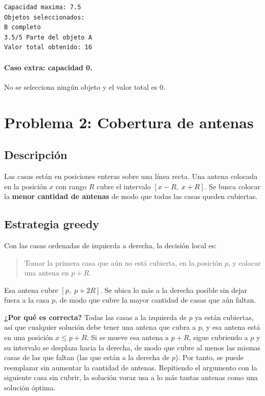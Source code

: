 \documentclass[11pt,a4paper]{article}
\begin{document}
\begin{verbatim}
Capacidad maxima: 7.5
Objetos seleccionados:
B completo
3.5/5 Parte del objeto A
Valor total obtenido: 16
\end{verbatim}

\paragraph{Caso extra: capacidad 0.} No se selecciona ningún objeto y el valor total es 0.

\section{Problema 2: Cobertura de antenas}

\subsection{Descripción}

Las casas están en posiciones enteras sobre una línea recta. Una antena colocada en la posición $x$ con rango $R$ cubre el intervalo $[x - R,\; x + R]$. Se busca colocar la \textbf{menor cantidad de antenas} de modo que todas las casas queden cubiertas.

\subsection{Estrategia greedy}

Con las casas ordenadas de izquierda a derecha, la decisión local es:

\begin{quote}
Tomar la primera casa que aún no está cubierta, en la posición $p$, y colocar una antena en $p + R$.
\end{quote}

Esa antena cubre $[p,\; p + 2R]$. Se ubica lo más a la derecha posible sin dejar fuera a la casa $p$, de modo que cubre la mayor cantidad de casas que aún faltan.

\textbf{¿Por qué es correcta?} Todas las casas a la izquierda de $p$ ya están cubiertas, así que cualquier solución debe tener una antena que cubra a $p$, y esa antena está en una posición $x \le p + R$. Si se mueve esa antena a $p + R$, sigue cubriendo a $p$ y su intervalo se desplaza hacia la derecha, de modo que cubre al menos las mismas casas de las que faltan (las que están a la derecha de $p$). Por tanto, se puede reemplazar sin aumentar la cantidad de antenas. Repitiendo el argumento con la siguiente casa sin cubrir, la solución voraz usa a lo más tantas antenas como una solución óptima.
\end{document}
